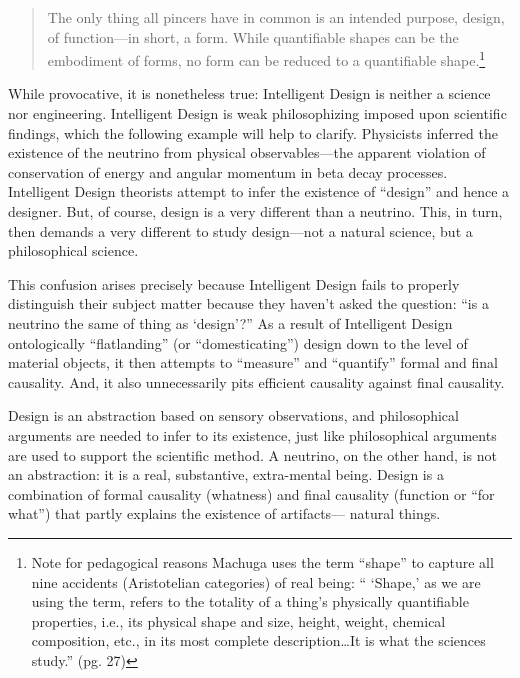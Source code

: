\begin{quote}
The only thing all pincers have in common is an intended purpose, design, of function---in short, a form. While quantifiable shapes can be the embodiment of forms, no form can be reduced to a quantifiable shape.\cite[pg.~162]{machuga}\footnote{Note for pedagogical reasons Machuga uses the term ``shape'' to capture all nine accidents (Aristotelian categories) of real being: `` `Shape,' as we are using the term, refers to the totality of a thing's physically quantifiable properties, i.e., its physical shape and size, height, weight, chemical composition, etc., in its most complete description\ldots It is what the sciences study.'' (pg. 27)}
\end{quote}

While provocative, it is nonetheless true: Intelligent Design is neither a science nor engineering. Intelligent Design is weak philosophizing imposed upon scientific findings, which the following example will help to clarify. Physicists inferred the existence of the neutrino from physical observables---the apparent violation of conservation of energy and angular momentum in beta decay processes. Intelligent Design theorists attempt to infer the existence of ``design'' and hence a designer. But, of course, design is a very different  than a neutrino. This, in turn, then demands a very different  to study design---not a natural science, but a philosophical science.

This confusion arises precisely because Intelligent Design fails to properly distinguish their subject matter because they haven't asked the question: ``is a neutrino the same  of thing as `design'?'' As a result of Intelligent Design ontologically ``flatlanding'' (or ``domesticating'') design down to the level of material objects, it then attempts to ``measure'' and ``quantify'' formal and final causality. And, it also unnecessarily pits efficient causality against final causality.

Design is an abstraction based on sensory observations, and philosophical arguments are needed to infer to its existence, just like philosophical arguments are used to support the scientific method. A neutrino, on the other hand, is not an abstraction: it is a real, substantive, extra-mental being. Design is a combination of formal causality (whatness) and final causality (function or ``for what'') that partly explains the existence of artifacts--- natural things.

